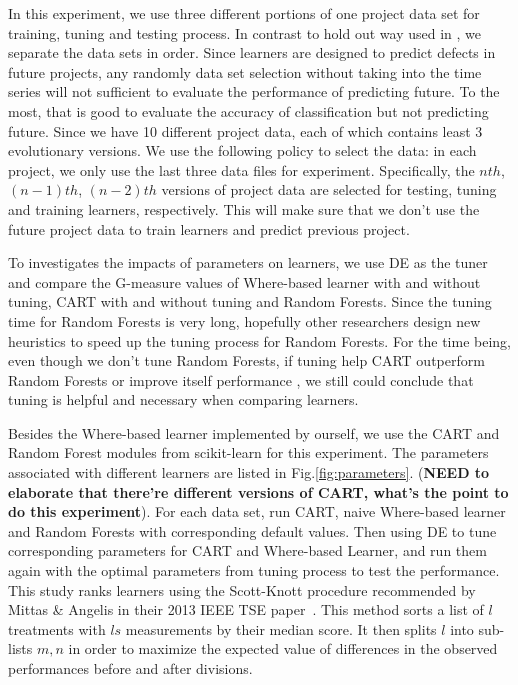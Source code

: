 \documentclass{acm_proc_article-sp}
\begin{document}
In this experiment, we use three different portions of one project data set for training, tuning 
and testing process. In contrast to hold out way used in \cite{lessmann2008benchmarking, 
menzies2007data}, we separate the data sets in order. Since learners are designed to predict 
defects in future projects,  any randomly data set selection without taking into the time series 
will not sufficient to evaluate the performance of predicting future. To the most, that is good to 
evaluate the accuracy of classification but not predicting future. Since we have 10 different 
project data, each of which contains least 3 evolutionary versions. We use the following policy 
to select the data: in each project, we only use the last three data files for experiment. 
Specifically, the $nth$,  $(n-1)th$, $(n-2)th$ versions of project data are selected for testing, 
tuning and training learners, respectively. This will make sure that we don't use the future 
project data to train learners and predict previous project.

To investigates the impacts of parameters on learners, we use DE as the tuner and compare the G-measure 
values of Where-based learner with and without tuning, CART with and without tuning and Random 
Forests. Since the tuning time for Random Forests is very long, hopefully other researchers design
new heuristics to speed up the tuning process for Random Forests.  For the time being, even though
we don't tune Random Forests, if tuning help CART outperform Random Forests or improve itself performance ,
we still could conclude that tuning is helpful and necessary when comparing learners.

Besides the Where-based learner implemented by ourself,  we use the CART and Random Forest modules 
from scikit-learn \cite{scikit-learn} for this experiment. The parameters associated with different learners are listed in Fig.\ref{fig:parameters}. (\textbf{NEED to elaborate that there're different versions of CART, what's the point to do this experiment}). For each data set, run CART, naive Where-based learner and Random Forests with corresponding default values. Then using DE to tune corresponding parameters for CART and Where-based Learner,  and run them again with the optimal parameters from tuning process to test the performance. 
This study ranks learners using the Scott-Knott procedure recommended by Mittas \& Angelis in their 2013
IEEE TSE paper~\cite{mittas2013ranking}.  This method sorts a list of $l$ treatments with $ls$ measurements by their median score. It then splits $l$ into sub-lists $m,n$ in order to maximize the expected value of differences  in the observed performances before and after divisions. 
\end{document}
